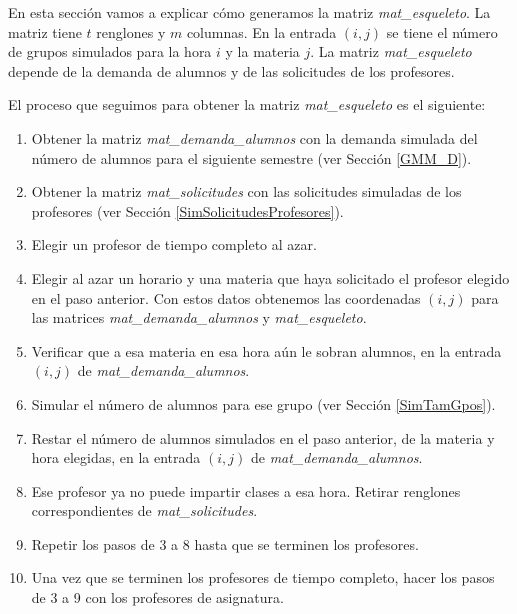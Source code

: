 En esta sección vamos a explicar cómo generamos la matriz \textit{mat\_esqueleto}. La matriz tiene $t$ renglones y $m$ columnas. En la entrada $(i,j)$ se tiene el número de grupos simulados para la hora $i$ y la materia $j$. La matriz \textit{mat\_esqueleto} depende de la demanda de alumnos y de las solicitudes de los profesores.


El proceso que seguimos para obtener la matriz \textit{mat\_esqueleto} es el siguiente:
  
  \begin{enumerate}
\item Obtener la matriz \textit{mat\_demanda\_alumnos} con la demanda simulada del número de alumnos para el siguiente semestre (ver Sección \ref{GMM_D}).

\item Obtener la matriz \textit{mat\_solicitudes} con las solicitudes simuladas de los profesores (ver Sección \ref{SimSolicitudesProfesores}).

\item Elegir un profesor de tiempo completo al azar.

\item Elegir al azar un horario y una materia que haya solicitado el profesor elegido en el paso anterior. Con estos datos obtenemos las coordenadas $(i,j)$ para las matrices \textit{mat\_demanda\_alumnos} y \textit{mat\_esqueleto}.

\item Verificar que a esa materia en esa hora aún le sobran alumnos, en la entrada $(i,j)$ de \textit{mat\_demanda\_alumnos}.

\item Simular el número de alumnos para ese grupo (ver Sección \ref{SimTamGpos}).

\item Restar el número de alumnos simulados en el paso anterior, de la materia y hora elegidas, en la entrada $(i,j)$ de \textit{mat\_demanda\_alumnos}.

\item Ese profesor ya no puede impartir clases a esa hora. Retirar renglones correspondientes de \textit{mat\_solicitudes}.

\item Repetir los pasos de 3 a 8 hasta que se terminen los profesores.

\item Una vez que se terminen los profesores de tiempo completo, hacer los pasos de 3 a 9 con los profesores de asignatura.
\end{enumerate}

